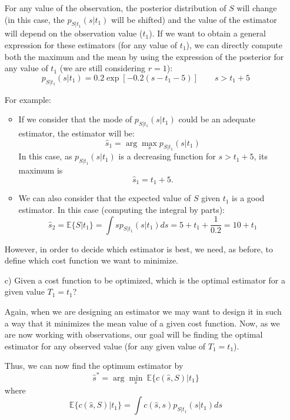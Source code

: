 \begin{solution}
\begin{itemize}
For any value of the observation, the posterior distribution of $S$ will change (in this case, the $ p_{S|t_1}(s|t_1)$ will be shifted) and the value of the estimator will depend on the observation value ($t_1$). If we want to obtain a general expression for these estimators (for any value of $t_1$), we can directly compute both the maximum and the mean by using the expression of the posterior for any value of $t_1$ (we are still considering $r=1$):
$$ p_{S|t_1}(s|t_1) = 0.2 \exp{\left[-0.2 (s-t_1-5)\right]} \quad \quad  s >t_1 +5$$

For example:

\begin{itemize}
\item If we consider that the mode of $ p_{S|t_1}(s|t_1)$ could be an adequate estimator, the estimator will be:
$$ \hat{s}_1  = {\arg\max_s}  p_{S|t_1}(s|t_1) $$
In this case, as $p_{S|t_1}(s|t_1) $ is a decreasing function for $s >t_1 +5$, its maximum is 
$$\hat{s}_1 = t_1 +5.$$

\item We can also consider that the expected value of $S$ given $t_1$ is a good estimator. In this case (computing the integral by parts):
$$\hat{s}_2= \mathbb{E}\{S|t_1\} = \int s p_{S|t_1}(s|t_1) ds = 5 + t_1 +\frac{1}{0.2} = 10+t_1$$
\end{itemize}


However, in order to decide which estimator is best, we need, as before, to define which cost function we want to minimize.

\item[c)] Given a cost function to be optimized, which is the optimal estimator for a given value $T_1=t_1$? 

Again, when we are designing an estimator we may want to design it in such a way that it minimizes the mean value of a given cost function. Now, as we are now working with observations, our goal will be finding the optimal estimator for any observed value (for any given value of $T_1=t_1$). 

Thus, we can now find the optimum estimator by 
$$ \hat{s}^{*} = \arg\min_s~ \mathbb{E}\{c(\hat{s},S)|t_1\}$$
where 
$$\mathbb{E}\{c(\hat{s},S)|t_1\} = \int c(\hat{s},s) p_{S|t_1}(s|t_1)  ds$$



\end{itemize}
\end{solution}
